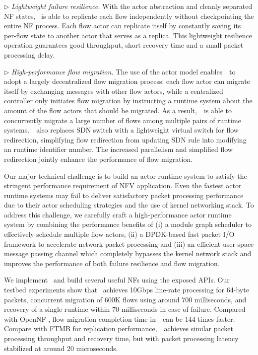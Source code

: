 $\triangleright$ {\em Lightweight failure resilience.} With the actor abstraction and cleanly separated NF states, \nfactor~is able to replicate each flow independently without checkpointing the entire NF process. Each flow actor can replicate itself by constantly saving its per-flow state to another actor that serves as a replica.
This lightweight resilience operation guarantees good throughput, short recovery time and a small packet processing delay.

$\triangleright$ {\em High-performance flow migration.} The use of the actor model enables~\nfactor~to adopt a largely decentralized flow migration process: each flow actor can migrate itself by exchanging messages with other flow actors, while a centralized controller only initiates flow migration by instructing a runtime system about the amount of the flow actors that should be migrated. As a result,~\nfactor~is able to concurrently migrate a large number of flows among multiple pairs of runtime systems.~\nfactor~also replaces SDN switch with a lightweight virtual switch for flow redirection, simplifying flow redirection from updating SDN rule into modifying an runtime identifier number. %
The increased parallelism and simplified flow redirection jointly enhance the performance of flow migration.

Our major technical challenge is to build an actor runtime system to satisfy the stringent performance requirement of NFV application. Even the fastest actor runtime systems \cite{chs-rapc-16} may fail to deliver satisfactory packet processing performance due to their actor scheduling strategies and the use of kernel networking stack. To address this challenge, we carefully craft a high-performance actor runtime system by combining the performance benefits of (i) a module graph scheduler to effectively schedule multiple flow actors, (ii) a DPDK-based \cite{dpdk} fast packet I/O framework \cite{bess} to accelerate network packet processing and (iii) an efficient user-space message passing channel which completely bypasses the kernel network stack and improves the performance of both failure resilience and flow migration.

We implement \nfactor~and build several useful NFs using the exposed APIs. Our testbed experiments show that \nfactor~achieves 10Gbps line-rate processing for 64-byte packets, concurrent migration of 600K flows using around 700 milliseconds, and recovery of a single runtime within 70 milliseconds in case of failure. Compared with OpenNF \cite{gember2015opennf}, flow migration completion time in~\nfactor~can be 144 times faster. Compare with FTMB \cite{sherry2015rollback} for replication performance,~\nfactor~achieves similar packet processing throughput and recovery time, but with packet processing latency stabilized at around 20 microseconds. %

